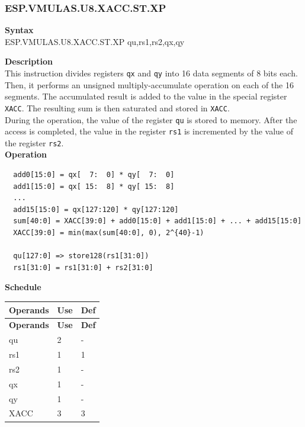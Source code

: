 \newpage
\subsubsection{ESP.VMULAS.U8.XACC.ST.XP}\label{instruction:ESPVMULASU8XACCSTXP}
\textbf{Syntax}\\
ESP.VMULAS.U8.XACC.ST.XP qu,rs1,rs2,qx,qy

\textbf{Description}\\

This instruction divides registers \lstinline{qx} and \lstinline{qy} into 16 data segments of 8 bits each. Then, it performs an unsigned multiply-accumulate operation on each of the 16 segments. The accumulated result is added to the value in the special register \lstinline{XACC}. The resulting sum is then saturated and stored in \lstinline{XACC}. \\ During the operation, the value of the register \lstinline{qu} is stored to memory. After the access is completed, the value in the register \lstinline{rs1} is incremented by the value of the register \lstinline{rs2}.\\
\textbf{Operation}
\begin{lstlisting}
  add0[15:0] = qx[  7:  0] * qy[  7:  0]
  add1[15:0] = qx[ 15:  8] * qy[ 15:  8]
  ...
  add15[15:0] = qx[127:120] * qy[127:120]
  sum[40:0] = XACC[39:0] + add0[15:0] + add1[15:0] + ... + add15[15:0]
  XACC[39:0] = min(max(sum[40:0], 0), 2^{40}-1)

  qu[127:0] => store128(rs1[31:0])
  rs1[31:0] = rs1[31:0] + rs2[31:0]
\end{lstlisting}

\textbf{Schedule}\\
\begin{longtable}[c]{|l|l|l|}
    \hline
    \rowcolor{lightgray}
    \textbf{Operands} & \textbf{Use} & \textbf{Def} \\\hline
    \endfirsthead
    \hline
    \rowcolor{lightgray}
     \textbf{Operands} & \textbf{Use} & \textbf{Def} \\\hline
    \endhead
    \hline
    \endfoot

    qu & 2 & - \\\hline
    rs1 & 1 & 1 \\\hline
    rs2 & 1 & - \\\hline
     qx & 1 & - \\\hline
     qy & 1 & - \\\hline
     XACC & 3 & 3

\end{longtable}


